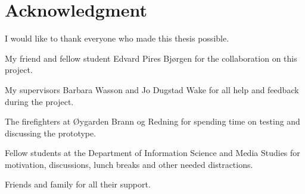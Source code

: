 \documentclass[../Main/thesis.tex]{subfiles}
\begin{document}
\chapter*{Acknowledgment}
I would like to thank everyone who made this thesis possible.

My friend and fellow student Edvard Pires Bjørgen for the collaboration on this project.

My supervisors Barbara Wasson and Jo Dugstad Wake for all help and feedback during the project.

The firefighters at Øygarden Brann og Redning for spending time on testing and discussing the prototype.

Fellow students at the Department of Information Science and Media Studies for motivation, discussions, lunch breaks and other needed distractions.

Friends and family for all their support.


\blankpage
\end{document}
